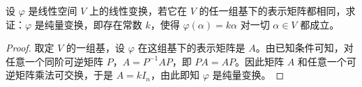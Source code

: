 \documentclass[lang=cn,12pt]{elegantbook}
\begin{document}

\begin{example}
    设 \(\varphi\) 是线性空间 \(V\) 上的线性变换，若它在 \(V\) 的任一组基下的表示矩阵都相同，求证：\(\varphi\) 是纯量变换，即存在常数 \(k\)，使得 \(\varphi(\alpha) = k\alpha\) 对一切 \(\alpha \in V\) 都成立。
\end{example}
    
\begin{proof}
    取定 \(V\) 的一组基，设 \(\varphi\) 在这组基下的表示矩阵是 \(A\)。由已知条件可知，对任意一个同阶可逆矩阵 \(P\)，\(A = P^{-1}AP\)，即 \(PA = AP\)。因此矩阵 \(A\) 和任意一个可逆矩阵乘法可交换，于是 \(A = kI_n\)，由此即知 \(\varphi\) 是纯量变换。
\end{proof}

    
\end{document}
